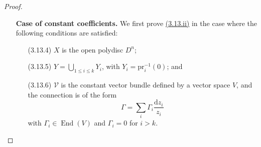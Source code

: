 \documentclass{report}
\renewcommand{\cal}[1]{{\mathcal{#1}}}
\newcommand{\dd}{\mathrm{d}}
\newcommand{\pr}{\mathrm{pr}}
\newcommand{\simto}{\xrightarrow{\raisebox{-0.7ex}[0ex][0ex]{$\sim$}}}
\renewcommand{\leq}{\leqslant}
\DeclareMathOperator{\End}{End}
\DeclareMathOperator{\Gr}{Gr}
\newcommand{\oldpage}[1]{\marginpar{\footnotesize$\Big\vert$ \textit{p.~#1}}}
\begin{document}
\begin{proof}
\begin{itemize}
      The evident isomorphism
      \[
        j_*^\mathrm{m}\Omega_{X_1^*}^\bullet
        \boxtimes j_*^\mathrm{m}\Omega_{X_2^*}^\bullet
        \simto j_*^\mathrm{m}\Omega_{X^*}^\bullet
      \]
\oldpage{82}
      identifies the filtration $P$ of $j_*^\mathrm{m}\Omega_{X^*}^\bullet$ with the external tensor product of the filtrations $P$ of the $j_*^\mathrm{m}\Omega_{X_i^*}^\bullet$.
      We thus have
      \[
      \label{II.3.13.3}
        \Gr_P\big(j_*^\mathrm{m}\Omega_{X_1^*}^\bullet(\cal{V}_1)\big)
        \boxtimes \Gr_P\big(j_*^\mathrm{m}\Omega_{X_2^*}^\bullet(\cal{V}_2)\big)
        \simto \Gr_P\big(j_*^\mathrm{m}\Omega_{X^*}^\bullet(\cal{V})\big).
      \tag{3.13.3}
      \]
      The morphism \hyperref[II.3.13.1]{(3.13.1)} can be identified, via \hyperref[II.3.13.2]{(3.13.2)} and \hyperref[II.3.13.3]{(3.13.3)}, with the external tensor product of the analogous morphisms for $\cal{V}_1$ and $\cal{V}_2$.
      Since the complexes in question have $\cal{O}_X$-linear differentials \hyperref[II.3.12]{(3.12.d)}, to prove that \hyperref[II.3.13.3] is a quasi-isomorphism, it suffices to prove the analogous claim for $\cal{V}_1$ and $\cal{V}_2$.
    \item[] \textbf{Case of constant coefficients.}
      We first prove \hyperref[II.3.13]{(3.13.ii)} in the case where the following conditions are satisfied:
      \begin{itemize}
        \item[(3.13.4)]\label{II.3.13.4}
          $X$ is the open polydisc $D^n$;
        \item[(3.13.5)]\label{II.3.13.5}
          $Y=\bigcup_{1\leq i\leq k}Y_i$, with $Y_i=\pr_i^{-1}(0)$; and
        \item[(3.13.6)]\label{II.3.13.6}
          $\cal{V}$ is the constant vector bundle defined by a vector space $V$, and the connection is of the form
          \[
            \Gamma = \sum_i\Gamma_i\frac{\dd z_i}{z_i}
          \]
          with $\Gamma_i\in\End(V)$ and $\Gamma_i=0$ for $i>k$.
      \end{itemize}


\end{itemize}
\end{proof}
\end{document}
